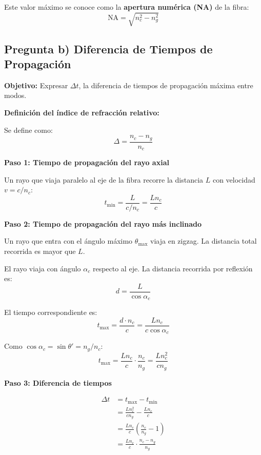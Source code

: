 \documentclass[11pt,a4paper]{article}
\begin{document}
Este valor máximo se conoce como la \textbf{apertura numérica (NA)} de la fibra:
\begin{equation}
    \text{NA} = \sqrt{n_c^2 - n_g^2}
\end{equation}

\subsection{Pregunta b) Diferencia de Tiempos de Propagación}

\textbf{Objetivo:} Expresar $\Delta t$, la diferencia de tiempos de propagación máxima entre modos.

\textbf{Definición del índice de refracción relativo:}

Se define como:
\begin{equation}
    \Delta = \frac{n_c - n_g}{n_c}
\end{equation}

\textbf{Paso 1: Tiempo de propagación del rayo axial}

Un rayo que viaja paralelo al eje de la fibra recorre la distancia $L$ con velocidad $v = c/n_c$:
\begin{equation}
    t_{\min} = \frac{L}{c/n_c} = \frac{Ln_c}{c}
\end{equation}

\textbf{Paso 2: Tiempo de propagación del rayo más inclinado}

Un rayo que entra con el ángulo máximo $\theta_{\max}$ viaja en zigzag. La distancia total recorrida es mayor que $L$.

El rayo viaja con ángulo $\alpha_c$ respecto al eje. La distancia recorrida por reflexión es:
\begin{equation}
    d = \frac{L}{\cos\alpha_c}
\end{equation}

El tiempo correspondiente es:
\begin{equation}
    t_{\max} = \frac{d \cdot n_c}{c} = \frac{Ln_c}{c\cos\alpha_c}
\end{equation}

Como $\cos\alpha_c = \sin\theta' = n_g/n_c$:
\begin{equation}
    t_{\max} = \frac{Ln_c}{c} \cdot \frac{n_c}{n_g} = \frac{Ln_c^2}{cn_g}
\end{equation}

\textbf{Paso 3: Diferencia de tiempos}

\begin{align}
    \Delta t &= t_{\max} - t_{\min} \\
    &= \frac{Ln_c^2}{cn_g} - \frac{Ln_c}{c} \\
    &= \frac{Ln_c}{c}\left(\frac{n_c}{n_g} - 1\right) \\
    &= \frac{Ln_c}{c} \cdot \frac{n_c - n_g}{n_g}
\end{align}
\end{document}

